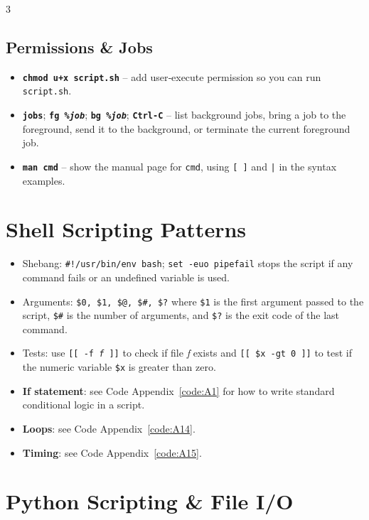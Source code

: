 \documentclass[6pt,landscape]{article}
\newcommand{\cmd}[1]{\textbf{\texttt{\textcolor{cmdcolor}{#1}}}}
\newcommand{\var}[1]{\emph{\textcolor{varcolor}{#1}}}
\begin{document}
\begin{multicols}{3}
\subsection{Permissions \& Jobs}\label{sec:permjobs}
\begin{itemize}
  \item \cmd{chmod u+x \texttt{script.sh}} – add user‐execute permission so you can run \texttt{script.sh}.
  \item \cmd{jobs}; \cmd{fg \%\var{job}}; \cmd{bg \%\var{job}}; \cmd{Ctrl‐C} – list background jobs, bring a job to the foreground, send it to the background, or terminate the current foreground job.
  \item \cmd{man \texttt{cmd}} – show the manual page for \texttt{cmd}, using \texttt{[ ]} and \texttt{|} in the syntax examples.
\end{itemize}


\section{Shell Scripting Patterns}\label{sec:shellpatterns}
\begin{itemize}
  \item Shebang: \texttt{\#!/usr/bin/env bash}; \texttt{set -euo pipefail} stops the script if any command fails or an undefined variable is used.
  \item Arguments: \texttt{\$0, \$1, \$@, \$\#, \$?} where \texttt{\$1} is the first argument passed to the script, \texttt{\$\#} is the number of arguments, and \texttt{\$?} is the exit code of the last command.
  \item Tests: use \texttt{[[ -f \var{f} ]]} to check if file \var{f} exists and \texttt{[[ \$x -gt 0 ]]} to test if the numeric variable \texttt{\$x} is greater than zero.
  \item \textbf{If statement}: see Code Appendix~\ref{code:A1} for how to write standard conditional logic in a script.
  \item \textbf{Loops}: see Code Appendix~\ref{code:A14}.
  \item \textbf{Timing}: see Code Appendix~\ref{code:A15}.
\end{itemize}


\section{Python Scripting \& File I/O}\label{sec:pythonscripting}


\end{multicols}
\end{document}
